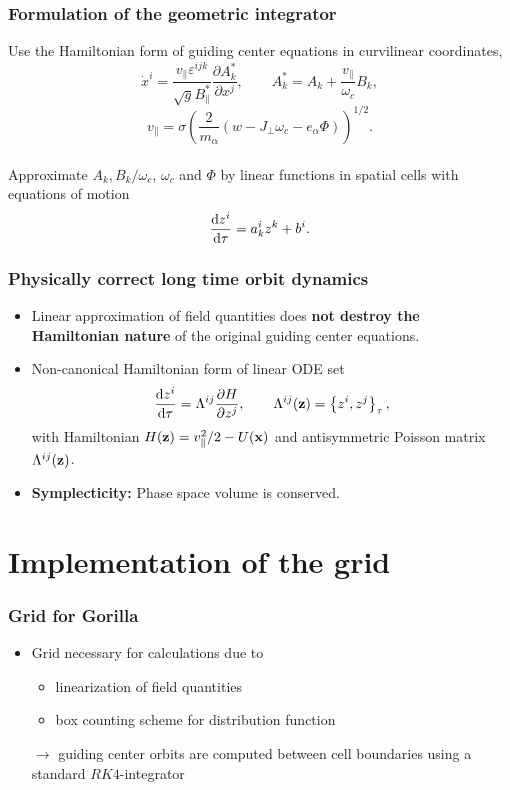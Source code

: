 \documentclass{beamer}
\newcommand{\be}[1]{\begin{equation} \label{#1}}
\newcommand{\ee}{\end{equation}}
\newcommand{\difp}[2]{\frac{\partial #1}{\partial #2}}
\newcommand{\bz}{{\bf z}}
\newcommand{\bx}{{\bf x}}
\newcommand{\rd}{{\rm d}}
\begin{document}
\begin{frame}
\frametitle{Formulation of the geometric integrator}
\vspace{-0.5cm}
Use the Hamiltonian form of guiding center equations in curvilinear coordinates,
\be{eqm_curv}
\dot x^i = \frac{v_\parallel \varepsilon^{ijk}}{\sqrt{g} B_\parallel^\ast}\difp{A^\ast_k}{x^j}, \qquad A^\ast_k = A_k + \frac{v_\parallel}{\omega_c}B_k,
\ee
\be{}
v_\parallel=\sigma \left(\frac{2}{m_\alpha}\left(w-J_\perp\omega_c-e_\alpha\Phi\right)\right)^{1/2}.
\ee
\vspace{0.2cm}\\
Approximate $A_k, B_k/ \omega_c$, $\omega_c$ and $\Phi$ by linear functions in spatial cells with equations of motion
\be{standeqset}
\frac{\rd z^i}{\rd \tau} = a^i_k z^k + b^i.
\ee
\end{frame}


\begin{frame}
\frametitle{Physically correct long time orbit dynamics}
\vspace{-0.5cm}
\begin{itemize}
	\item
	Linear approximation of field quantities does \textbf{not destroy the Hamiltonian nature} of the original guiding center equations.
	\item Non-canonical Hamiltonian form of linear ODE set
	\be{hamform}
	\frac{\rd z^i}{\rd \tau}=\Lambda^{ij}\difp{H}{z^j}, \qquad \Lambda^{ij}(\bz)=\left\{z^i,z^j\right\}_\tau,
	\ee
	with Hamiltonian $H(\bz)=v_\parallel^2/2-U(\bx)$ and antisymmetric Poisson matrix  $\Lambda^{ij}(\bz)$.
	\item \textbf{Symplecticity:} Phase space volume is conserved.
\end{itemize}

\end{frame}

\section{Implementation of the grid}

\begin{frame}
\frametitle{Grid for \textbf{Gorilla}}
\begin{itemize}
\item Grid necessary for calculations due to
\begin{itemize}
\item linearization of field quantities
\item box counting scheme for distribution function
\end{itemize}
 $\rightarrow$ guiding center orbits are computed between cell boundaries using a standard $RK4$-integrator
\end{itemize}
\end{frame}
\end{document}
